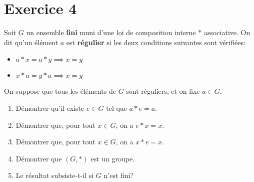 \documentclass{report}
\begin{document}
\section{Exercice 4}
\qs{}
{
Soit $G$ un ensemble \textbf{fini} muni d'une loi de composition interne $*$
associative. On dit qu'un élément $a$ est \textbf{régulier} si les deux
conditions suivantes sont vérifiées:
\begin{itemize}
  \item $a * x = a * y \implies x = y$
  \item $x *a  = y * a \implies x = y$
\end{itemize}
On suppose que tous les éléments de $G$ sont réguliers, et on fixe $a\in G$.

\begin{enumerate}
  \item Démontrer qu'il existe $e\in G$ tel que $a*e = a$.\\[2pt]
  \item Démontrer que, pour tout $x\in G$, on a $e*x = x$.\\[2pt]
  \item Démontrer que, pour tout $x\in G$, on a $x*e = x$.\\[2pt]
  \item Démontrer que $\left(G, *\right)$ est un groupe.
  \item Le résultat subsiste-t-il si $G$ n'est fini?
\end{enumerate}
}
\end{document}
